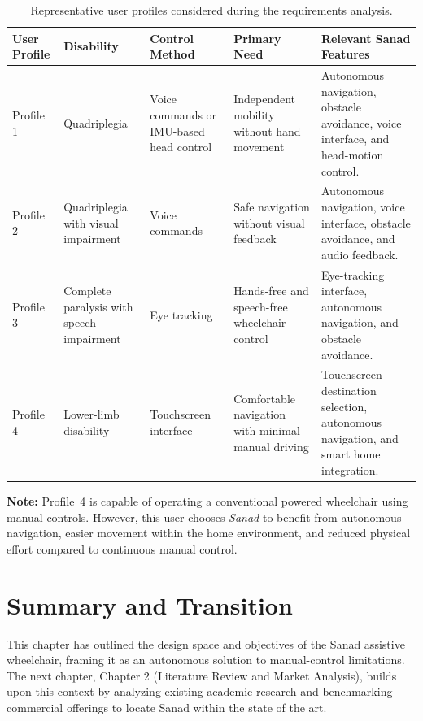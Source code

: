 \begin{table}[H]
\centering
\caption{Representative user profiles considered during the requirements analysis.}
\label{tab:user_personas}
\renewcommand{\arraystretch}{1.4}

\begin{tabularx}{\textwidth}{|>{\centering\arraybackslash}p{1.8cm}|
                                >{\raggedright\arraybackslash}p{2.8cm}|
                                >{\raggedright\arraybackslash}X|
                                >{\raggedright\arraybackslash}X|
                                >{\raggedright\arraybackslash}X|}
\hline
\textbf{User Profile} &
\textbf{Disability} &
\textbf{Control Method} &
\textbf{Primary Need} &
\textbf{Relevant Sanad Features} \\
\hline

Profile 1 &
Quadriplegia &
Voice commands or IMU-based head control &
Independent mobility without hand movement &
Autonomous navigation, obstacle avoidance, voice interface, and head-motion control. \\
\hline

Profile 2 &
Quadriplegia with visual impairment &
Voice commands &
Safe navigation without visual feedback &
Autonomous navigation, voice interface, obstacle avoidance, and audio feedback. \\
\hline

Profile 3 &
Complete paralysis with speech impairment &
Eye tracking &
Hands-free and speech-free wheelchair control &
Eye-tracking interface, autonomous navigation, and obstacle avoidance. \\
\hline

Profile 4 &
Lower-limb disability &
Touchscreen interface &
Comfortable navigation with minimal manual driving &
Touchscreen destination selection, autonomous navigation, and smart home integration. \\
\hline

\end{tabularx}
\end{table}

\noindent\textbf{Note:} Profile~4 is capable of operating a conventional powered wheelchair using manual controls. However, this user chooses \textit{Sanad} to benefit from autonomous navigation, easier movement within the home environment, and reduced physical effort compared to continuous manual control.

\section{Summary and Transition}
This chapter has outlined the design space and objectives of the Sanad assistive wheelchair, framing it as an autonomous solution to manual-control limitations. The next chapter, Chapter 2 (Literature Review and Market Analysis), builds upon this context by analyzing existing academic research and benchmarking commercial offerings to locate Sanad within the state of the art.
